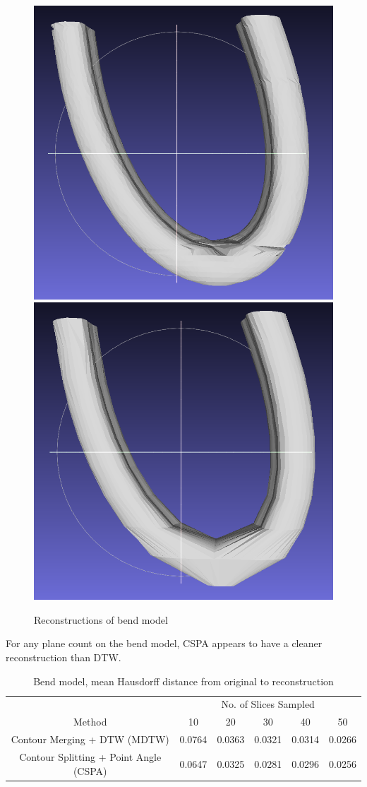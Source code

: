 \documentclass[11p, titlepage]{article}
\newcommand{\reconstructionright}{0.67}
\begin{document}
\begin{figure}[h!]
\begin{minipage}[b]{\reconstructionright\linewidth}
       \hfill
       {\includegraphics[width=.48\linewidth]{reconstructions/cspa50-bend-50}}%
       \hfill
       {\includegraphics[width=.48\linewidth]{reconstructions/cspa50-bend-10}}
     \end{minipage}%
        \caption{Reconstructions of bend model}
        \label{fig:bend_reconstructions}
\end{figure}

For any plane count on the bend model, CSPA appears to have a cleaner reconstruction than DTW.

\begin{table}[h!]
\begin{tabular}{ | c | c | c | c | c | c | }
\hline
& \multicolumn{5}{c|}{No. of Slices Sampled} \\
\cline{2-6}
Method & 10 & 20 & 30 & 40 & 50 \\
\hline
Contour Merging + DTW (MDTW) & 0.0764 & 0.0363 & 0.0321 & 0.0314 & 0.0266 \\
Contour Splitting + Point Angle (CSPA) & 0.0647 & 0.0325 & 0.0281 & 0.0296 & 0.0256 \\
\hline
\end{tabular}
\caption{Bend model, mean Hausdorff distance from original to reconstruction}
\label{table:bend_forward}
\end{table}
\end{document}
